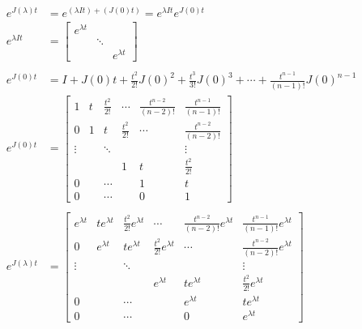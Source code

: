 \documentclass[twoside]{article}
\begin{document}
%
\begin{align*}
	e^{J(\lambda) t} &= e^{(\lambda I t) + (J(0) t)} = e^{\lambda I t} e^{J(0) t} 
	\\
	e^{\lambda I t} &= \left[ \begin{array}{ccc} e^{\lambda t} &  &   \\   &  \ddots & \\ & & e^{\lambda t} \end{array} \right]
	\\
	\\
	e^{J(0) t} &= I + J(0) t + \frac{t^2}{2 !} J(0)^2 + \frac{t^3}{3 !} J(0)^3 + \cdots + \frac{t^{n-1}}{(n-1)!} J(0)^{n-1} 
	\\
	e^{J(0) t} &= \left[  \begin{array}{cccccc} 1 & t & \frac{t^2}{2 !} & \cdots & \frac{t^{n-2}}{(n-2) !}  & \frac{t^{n-1}}{(n-1) !} 
\\ 0 & 1 & t & \frac{t^2}{2 !} & \cdots  & \frac{t^{n-2}}{(n-2) !} 
\\  \vdots &  & \ddots &  &  & \vdots \\ 
& & & 1 & t & \frac{t^2}{2 !}
\\ 0 &  & \cdots  &  & 1 & t \\
0 &  & \cdots &  & 0 & 1 \end{array} \right] 
\\
\\
e^{J(\lambda) t} &= \left[  \begin{array}{cccccc} e^{\lambda t} & t e^{\lambda t} & \frac{t^2}{2 !} e^{\lambda t} 
& \cdots & \frac{t^{n-2}}{(n-2) !} e^{\lambda t}  & \frac{t^{n-1}}{(n-1) !} e^{\lambda t}
\\ 0 & e^{\lambda t} & t e^{\lambda t} & \frac{t^2}{2 !} e^{\lambda t} & \cdots  & \frac{t^{n-2}}{(n-2) !} e^{\lambda t}
\\  \vdots &  & \ddots &  &  & \vdots \\ 
& & & e^{\lambda t} & t e^{\lambda t} & \frac{t^2}{2 !} e^{\lambda t}
\\ 0 &  & \cdots  &  & e^{\lambda t} & t e^{\lambda t} \\
0 &  & \cdots &  & 0 & e^{\lambda t} \end{array} \right] 
\end{align*}

\end{document}
